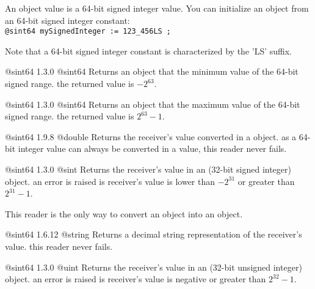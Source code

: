

An  object value is a 64-bit signed integer value. You can initialize an  object from an 64-bit signed integer constant:\\

\texttt{@sint64 mySignedInteger := 123\_456LS ;}

Note that a 64-bit signed integer constant is characterized by the 'LS' suffix.




{@sint64}
{1.3.0}
{@sint64}
{Returns an  object that the minimum value of the 64-bit signed range.}
{the returned value is $-2^{63}$.}





{@sint64}
{1.3.0}
{@sint64}
{Returns an  object that the maximum value of the 64-bit signed range.}
{the returned value is $2^{63}-1$.}





{@sint64}
{1.9.8}
{@double}
{Returns the receiver's value converted in a  object.}
{as a 64-bit integer value can always be converted in a  value, this reader never fails.}




{@sint64}
{1.3.0}
{@sint}
{Returns the receiver's value in an  (32-bit signed integer) object.}
{an error is raised is receiver's value is lower than $-2^{31}$ or greater than $2^{31}-1$.}

This reader is the only way to convert an  object into an  object.





{@sint64}
{1.6.12}
{@string}
{Returns a decimal string representation of the receiver's value.}
{this reader never fails.}








{@sint64}
{1.3.0}
{@uint}
{Returns the receiver's value in an  (32-bit unsigned integer) object.}
{an error is raised is receiver's value is negative or greater than $2^{32}-1$.}

